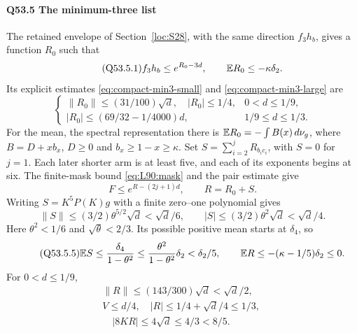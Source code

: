 \paragraph{Q53.5 The minimum-three list}\label{part:Q53.5}
The retained envelope of Section~\ref{loc:S28}, with the same direction
$f_3h_b$, gives a function $R_0$ such that
\begin{equation}\tag{Q53.5.1}\label{eq:Q53:firstpair}
 f_3h_b\le e^{R_0-3d},\qquad \mathbb E R_0\le-\kappa\delta_2.
\end{equation}
Its explicit estimates \eqref{eq:compact-min3-small} and
\eqref{eq:compact-min3-large} are
\begin{equation}\tag{Q53.5.2}\label{eq:Q53:pair-ranges}
 \begin{cases}
 \|R_0\|\le(31/100)\sqrt d,\quad |R_0|\le1/4,&0<d\le1/9,\\
 |R_0|\le(69/32-1/4000)d,&1/9\le d\le1/3.
 \end{cases}
\end{equation}
For the mean, the spectral representation there is
$\mathbb E R_0=\allowbreak -\int B(x)\,\allowbreak d\nu_g$, where $B=\allowbreak D+xb_x$, $D\ge\allowbreak 0$ and
$b_x\ge\allowbreak 1-x\ge\allowbreak \kappa$.
Set $S=\allowbreak \sum_{i=\allowbreak 2}^jR_{b_ic_i}$, with $S=\allowbreak 0$ for $j=\allowbreak 1$.
Each later shorter arm is at least five, and each of its exponents begins
at six. The finite-mask bound \eqref{eq:L90:mask} and the pair estimate give
\begin{equation}\tag{Q53.5.3}\label{eq:Q53:whole-envelope}
 F\le e^{R-(2j+1)d},\qquad R=R_0+S.
\end{equation}
Writing $S=\allowbreak K^5P(K)g$ with a finite zero--one polynomial gives
\begin{equation}\tag{Q53.5.4}\label{eq:Q53:tail}
 \|S\|\le(3/2)\theta^{5/2}\sqrt d<\sqrt d/6,
 \qquad |S|\le(3/2)\theta^2\sqrt d<\sqrt d/4.
\end{equation}
Here $\theta^2<\allowbreak 1/6$ and $\sqrt\theta<\allowbreak 2/3$. Its possible positive mean
starts at $\delta_4$, so
\begin{equation}\tag{Q53.5.5}\label{eq:Q53:mean}
 \mathbb E S\le\frac{\delta_4}{1-\theta^2}
 \le\frac{\theta^2}{1-\theta^2}\delta_2<\delta_2/5,
 \qquad\mathbb E R\le-(\kappa-1/5)\delta_2\le0.
\end{equation}
For $0<\allowbreak d\le\allowbreak 1/9$,
\[
\begin{gathered}
\|R\|\le(143/300)\sqrt d<\sqrt d/2,\quad\\
V\le d/4,\quad |R|\le1/4+\sqrt d/4\le1/3,\\
\quad |8KR|\le4\sqrt d\le4/3<8/5.
\end{gathered}
\]
